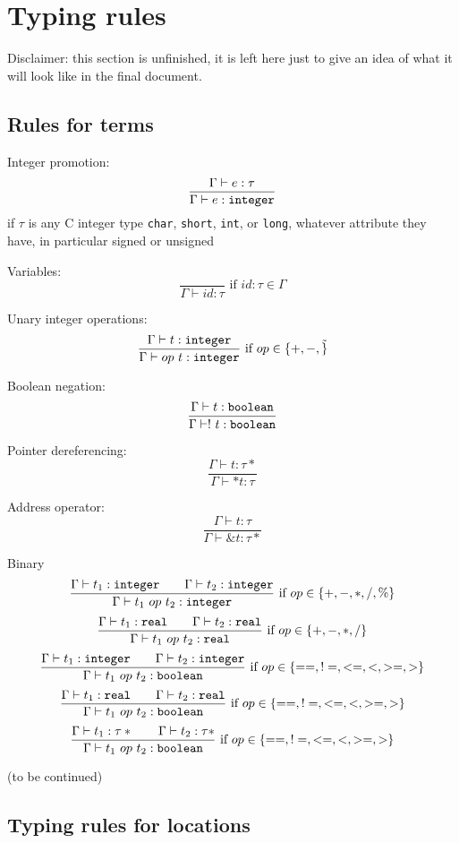 \section{Typing rules}
\label{sec:typingrules}

Disclaimer: this section is unfinished, it is left here just to give an idea of what it will look like in the final document.

\subsection{Rules for terms}

Integer promotion:
\[
\frac{\Gamma \vdash e : \tau}{\Gamma \vdash e : \texttt{integer}} 
\]
if $\tau$ is any C integer type \verb|char|, \verb|short|, \verb|int|, or \verb|long|, whatever attribute they have, in particular signed or unsigned

Variables:
\[
\frac{}{\Gamma \vdash id : \tau} \mbox{ if $id:\tau\in\Gamma$}
\]

Unary integer operations:
\[
\frac{\Gamma \vdash t : \texttt{integer}}{\Gamma \vdash op~t : \texttt{integer}} \mbox{ if $op\in \{+,-,\tilde\}$}
\]

Boolean negation:
\[
\frac{\Gamma \vdash t : \texttt{boolean}}{\Gamma \vdash !~t : \texttt{boolean}} 
\]

Pointer dereferencing:
\[
\frac{\Gamma \vdash t : \tau*}{\Gamma \vdash *t : \tau} 
\]

Address operator:
\[
\frac{\Gamma \vdash t : \tau}{\Gamma \vdash \&t : \tau*} 
\]

Binary
\[
\frac{\Gamma \vdash t_1 : \texttt{integer}\qquad\Gamma \vdash t_2 : \texttt{integer}}{\Gamma \vdash t_1~op~t_2 : \texttt{integer}} \mbox{ if $op\in \{+,-,*,/,\%\}$}
\]
\[
\frac{\Gamma \vdash t_1 : \texttt{real}\qquad\Gamma \vdash t_2 : \texttt{real}}{\Gamma \vdash t_1~op~t_2 : \texttt{real}} \mbox{ if $op\in \{+,-,*,/\}$}
\]
\[
\frac{\Gamma \vdash t_1 : \texttt{integer}\qquad\Gamma \vdash t_2 : \texttt{integer}}{\Gamma \vdash t_1~op~t_2 : \texttt{boolean}} \mbox{ if $op\in \{==,!=,<=,<,>=,>\}$}
\]
\[
\frac{\Gamma \vdash t_1 : \texttt{real}\qquad\Gamma \vdash t_2 : \texttt{real}}{\Gamma \vdash t_1~op~t_2 : \texttt{boolean}} \mbox{ if $op\in \{==,!=,<=,<,>=,>\}$}
\]
\[
\frac{\Gamma \vdash t_1 : \tau*\qquad\Gamma \vdash t_2 : \tau*}{\Gamma \vdash t_1~op~t_2 : \texttt{boolean}} \mbox{ if $op\in \{==,!=,<=,<,>=,>\}$}
\]

(to be continued)


\subsection{Typing rules for locations}

